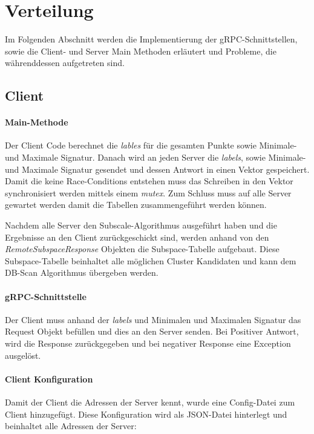 \section{Verteilung}
\label{sec:verteilung}
Im Folgenden Abschnitt werden die Implementierung der gRPC-Schnittstellen, sowie die Client- und Server Main Methoden erläutert und Probleme, die währenddessen aufgetreten sind.

\subsection{Client}
\label{sec:client}

\paragraph{Main-Methode} Der Client Code berechnet die \textit{lables} für die gesamten Punkte sowie Minimale- und Maximale Signatur. Danach wird an jeden Server die \textit{labels}, sowie Minimale- und Maximale Signatur gesendet und dessen Antwort in einen Vektor gespeichert. Damit die keine Race-Conditions entstehen muss das Schreiben in den Vektor synchronisiert werden mittels einem \textit{mutex}. Zum Schluss muss auf alle Server gewartet werden damit die Tabellen zusammengeführt werden können.

Nachdem alle Server den Subscale-Algorithmus ausgeführt haben und die Ergebnisse an den Client zurückgeschickt sind, werden anhand von den \textit{RemoteSubspaceResponse} Objekten die Subspace-Tabelle aufgebaut. Diese Subspace-Tabelle beinhaltet alle möglichen Cluster Kandidaten und kann dem DB-Scan Algorithmus übergeben werden.

\paragraph{gRPC-Schnittstelle} Der Client muss anhand der \textit{labels} und Minimalen und Maximalen Signatur das Request Objekt befüllen und dies an den Server senden. Bei Positiver Antwort, wird die Response zurückgegeben und bei negativer Response eine Exception ausgelöst.


\paragraph{Client Konfiguration} Damit der Client die Adressen der Server kennt, wurde eine Config-Datei zum Client hinzugefügt. Diese Konfiguration wird als JSON-Datei hinterlegt und beinhaltet alle Adressen der Server:


